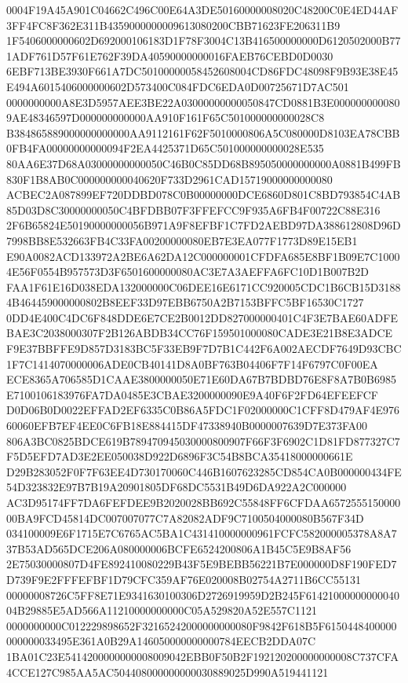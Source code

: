 \documentclass[UTF8,fontset=fandol,zihao=-4,a4paper]{ctexart}
\begin{document}
{{0004F19A45A901C04662C496C00E64A3DE50160000008020C48200C0E4ED44AF3FF4FC8F362E311B4359000000009613080200CBB71623FE206311B9
1F5406000000602D692000106183D1F78F3004C13B416500000000D6120502000B771ADF761D57F61E762F39DA40590000000016FAEB76CEBD0D0030
6EBF713BE3930F661A7DC50100000058452608004CD86FDC48098F9B93E38E45E494A6015406000000602D573400C084FDC6EDA0D00725671D7AC501
0000000000A8E3D5957AEE3BE22A03000000000050847CD0881B3E0000000000809AE48346597D000000000000AA910F161F65C501000000000028C8
B384865889000000000000AA9112161F62F5010000806A5C080000D8103EA78CBB0FB4FA00000000000094F2EA4425371D65C501000000000028E535
80AA6E37D68A03000000000050C46B0C85DD68B895050000000000A0881B499FB830F1B8AB0C000000000040620F733D2961CAD15719000000000080
ACBEC2A087899EF720DDBD078C0B00000000DCE6860D801C8BD793854C4AB85D03D8C30000000050C4BFDBB07F3FFEFCC9F935A6FB4F00722C88E316
2F6B65824E50190000000056B971A9F8EFBF1C7FD2AEBD97DA388612808D96D7998BB8E532663FB4C33FA00200000080EB7E3EA077F1773D89E15EB1
E90A0082ACD133972A2BE6A62DA12C000000001CFDFA685E8BF1B09E7C10004E56F0554B957573D3F6501600000080AC3E7A3AEFFA6FC10D1B007B2D
FAA1F61E16D038EDA132000000C06DEE16E6171CC920005CDC1B6CB15D31884B464459000000802B8EEF33D97EBB6750A2B7153BFFC5BF16530C1727
0DD4E400C4DC6F848DDE6E7CE2B0012DD827000000401C4F3E7BAE60ADFEBAE3C2038000307F2B126ABDB34CC76F159501000080CADE3E21B8E3ADCE
F9E37BBFFE9D857D3183BC5F33EB9F7D7B1C442F6A002AECDF7649D93CBC1F7C1414070000006ADE0CB40141D8A0BF763B04406F7F14F6797C0F00EA
ECE8365A706585D1CAAE3800000050E71E60DA67B7BDBD76E8F8A7B0B6985E7100106183976FA7DA0485E3CBAE3200000090E9A40F6F2FD64EFEEFCF
D0D06B0D0022EFFAD2EF6335C0B86A5FDC1F02000000C1CFF8D479AF4E97660060EFB7EF4EE0C6FB18E884415DF47338940B0000007639D7E373FA00
806A3BC0825BDCE619B789470945030000800907F66F3F6902C1D81FD877327C7F5D5EFD7AD3E2EE050038D922D6896F3C54B8BCA35418000000661E
D29B283052F0F7F63EE4D730170060C446B1607623285CD854CA0B000000434FE54D323832E97B7B19A20901805DF68DC5531B49D6DA922A2C000000
AC3D95174FF7DA6FEFDEE9B2020028BB692C55848FF6CFDAA657255515000000BA9FCD45814DC007007077C7A82082ADF9C7100504000080B567F34D
034100009E6F1715E7C6765AC5BA1C431410000000961FCFC582000005378A8A737B53AD565DCE206A080000006BCFE6524200806A1B45C5E9B8AF56
2E75030000807D4FE892410080229B43F5E9BEBB56221B7E000000D8F190FED7D739F9E2FFFEFBF1D79CFC359AF76E020008B02754A2711B6CC55131
00000008726C5FF8E71E9341630100306D2726919959D2B245F6142100000000004004B29885E5AD566A11210000000000C05A529820A52E557C1121
0000000000C012229898652F32165242000000000080F9842F618B5F6150448400000000000033495E361A0B29A146050000000000784EECB2DDA07C
1BA01C23E5414200000000008009042EBB0F50B2F192120200000000008C737CFA4CCE127C985AA5AC504408000000000030889025D990A519441121
}}
\end{document}
